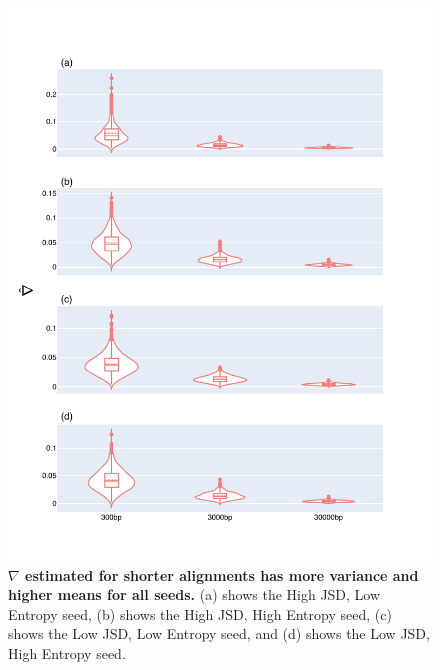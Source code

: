 \begin{figure}[!ht]
\centering
\includegraphics[width=\textwidth]{figures/plots/synthetic/convergence/all_seeds.pdf}
\caption[$\nabla$ estimated for shorter alignments has more variance and higher means for all seeds]{\textbf{$\nabla$ estimated for shorter alignments has more variance and higher means for all seeds.} (a) shows the High JSD, Low Entropy seed, (b) shows the High JSD, High Entropy seed, (c) shows the Low JSD, Low Entropy seed, and (d) shows the Low JSD, High Entropy seed.}
\label{fig:synthetic/conv/all_seeds}
\end{figure}
